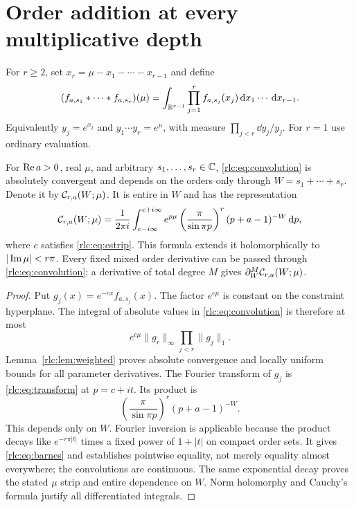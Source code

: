 \section{Order addition at every multiplicative depth}
\label{rlc:sec:convolution}

For $r\ge2$, set $x_r=\mu-x_1-\cdots-x_{r-1}$ and define
\begin{equation}\label{rlc:eq:convolution}
 (f_{a,s_1}*\cdots*f_{a,s_r})(\mu)
 =\int_{\mathbb R^{r-1}}\prod_{j=1}^r f_{a,s_j}(x_j)
       \,\mathrm d x_1\cdots\,\mathrm d x_{r-1}.
\end{equation}
Equivalently $y_j=e^{x_j}$ and $y_1\cdots y_r=e^\mu$, with measure
$\prod_{j<r}\dd y_j/y_j$. For $r=1$ use ordinary evaluation.

\begin{theorem}\label{rlc:thm:addition}
For $\operatorname{Re} a>0$, real $\mu$, and arbitrary $s_1,\ldots,s_r\in\mathbb C$,
\eqref{rlc:eq:convolution} is absolutely convergent and depends on the
orders only through $W=s_1+\cdots+s_r$. Denote it by $\mathcal C_{r,a}(W;\mu)$.
It is entire in $W$ and has the representation
\begin{equation}\label{rlc:eq:barnes}
 \mathcal C_{r,a}(W;\mu)=\frac1{2\pi i}\int_{c-i\infty}^{c+i\infty}
 e^{p\mu}\left(\frac{\pi}{\sin\pi p}\right)^r
 (p+a-1)^{-W}\,\mathrm d p,
\end{equation}
where $c$ satisfies \eqref{rlc:eq:cstrip}. This formula extends it
holomorphically to $|\operatorname{Im}\mu|<r\pi$.
Every fixed mixed order derivative can be passed through
\eqref{rlc:eq:convolution}; a derivative of total degree $M$ gives
$\partial_W^M\mathcal C_{r,a}(W;\mu)$.
\end{theorem}
\begin{proof}
Put $g_j(x)=e^{-cx}f_{a,s_j}(x)$. The factor $e^{c\mu}$ is constant
on the constraint hyperplane. The integral of absolute values in
\eqref{rlc:eq:convolution} is therefore at most
\[
 e^{c\mu}\|g_r\|_\infty\prod_{j<r}\|g_j\|_1.
\]
Lemma~\ref{rlc:lem:weighted} proves absolute convergence and locally
uniform bounds for all parameter derivatives. The Fourier transform of
$g_j$ is \eqref{rlc:eq:transform} at $p=c+it$. Its product is
\[
 \left(\frac{\pi}{\sin\pi p}\right)^r(p+a-1)^{-W}.
\]
This depends only on $W$. Fourier inversion is applicable because the
product decays like $e^{-r\pi|t|}$ times a fixed power of $1+|t|$ on
compact order sets. It gives \eqref{rlc:eq:barnes} and establishes
pointwise equality, not merely equality almost everywhere; the
convolutions are continuous. The same exponential decay proves the
stated $\mu$ strip and entire dependence on $W$. Norm holomorphy and
Cauchy's formula justify all differentiated integrals.
\end{proof}

